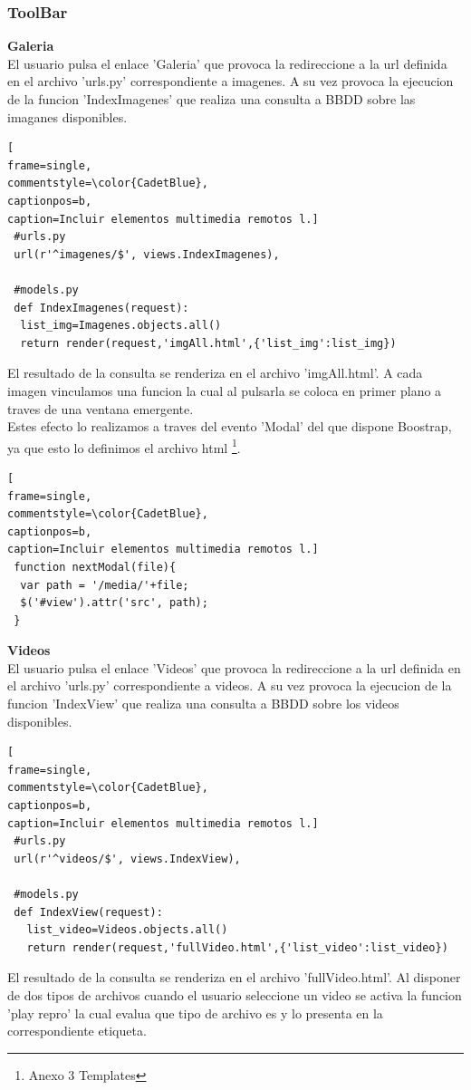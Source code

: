 \subsubsection{ToolBar}
\textbf{Galeria}
\\El usuario pulsa el enlace 'Galeria' que provoca la redireccione a la url definida en el archivo 'urls.py' correspondiente a imagenes. A su vez provoca la ejecucion de la funcion 'IndexImagenes' que realiza una consulta a BBDD sobre las imaganes disponibles.
\begin{lstlisting}[
frame=single,
commentstyle=\color{CadetBlue},
captionpos=b,
caption=Incluir elementos multimedia remotos l.]
 #urls.py
 url(r'^imagenes/$', views.IndexImagenes),

 #models.py
 def IndexImagenes(request):
  list_img=Imagenes.objects.all()
  return render(request,'imgAll.html',{'list_img':list_img})
\end{lstlisting}
El resultado de la consulta se renderiza en el archivo 'imgAll.html'. A cada  imagen vinculamos una funcion la cual al pulsarla se coloca en primer plano a traves de una ventana emergente.
\\Estes efecto lo realizamos a traves del evento 'Modal' del que dispone Boostrap, ya que esto lo definimos el archivo html \footnote{Anexo 3 Templates}.
\begin{lstlisting}[
frame=single,
commentstyle=\color{CadetBlue},
captionpos=b,
caption=Incluir elementos multimedia remotos l.]
 function nextModal(file){
  var path = '/media/'+file;
  $('#view').attr('src', path);
 }
\end{lstlisting}
\textbf{Videos}
\\El usuario pulsa el enlace 'Videos' que provoca la redireccione a la url definida en el archivo 'urls.py' correspondiente a videos. A su vez provoca la ejecucion de la funcion 'IndexView' que realiza una consulta a BBDD sobre los videos disponibles.
\lstset{language=, breaklines=true, basicstyle=\footnotesize}
\begin{lstlisting}[
frame=single,
commentstyle=\color{CadetBlue},
captionpos=b,
caption=Incluir elementos multimedia remotos l.]
 #urls.py
 url(r'^videos/$', views.IndexView),
 
 #models.py
 def IndexView(request):
   list_video=Videos.objects.all()
   return render(request,'fullVideo.html',{'list_video':list_video})
\end{lstlisting}
El resultado de la consulta se renderiza en el archivo 'fullVideo.html'. Al disponer de dos tipos de archivos cuando el usuario seleccione un video se activa la funcion 'play repro' la cual evalua que tipo de archivo es y lo presenta en la correspondiente etiqueta. 

